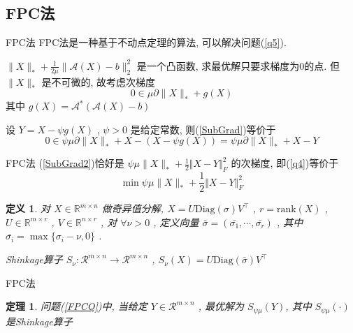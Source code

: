 \documentclass[slidestop, compress, mathserif, UTF8]{beamer}
\newtheorem{theo}{\bf \textcolor[rgb]{0.8,0,0}{定理}}[section]          %
\newtheorem{define}{\bf \textcolor[rgb]{0.8,0,0}{定义}}[section]
\numberwithin{equation}{section}                                        %
\begin{document}
		\subsection{FPC法}        
			\begin{frame}[t]{FPC法}
				FPC法是一种基于不动点定理的算法, 可以解决问题(\ref{q5}).

				$\lVert{X}\rVert_*+\frac{1}{2\mu}\lVert{\mathcal{A}(X)-b}\rVert_2^2$ 是一个凸函数, 求最优解只要求梯度为0的点. 但 $\lVert{X}\rVert_*$ 是不可微的, 故考虑次梯度
				\begin{equation}\label{SubGrad}
					0 \in \mu \partial \lVert{X}\rVert_* + g(X)
				\end{equation}
				\small{其中 $g(X) = \mathcal{A}^*(\mathcal{A}(X) - b)$}\normalsize

				设 $Y = X - \psi g(X)$ , $\psi > 0$ 是给定常数, 则(\ref{SubGrad})等价于
				\begin{equation}\label{SubGrad2}
					0 \in \psi \mu \partial \lVert{X}\rVert_* + X - (X - \psi g(X)) = \psi \mu \partial \lVert{X}\rVert_* + X -Y
				\end{equation}
			\end{frame}
			\begin{frame}[t]{FPC法}
				(\ref{SubGrad2})恰好是 $\psi \mu \lVert{X}\rVert_* + \frac{1}{2} \Vert{X - Y}\Vert^2_F$ 的次梯度, 即(\ref{q4})等价于 
				\begin{equation}\label{FPCQ}
					\min \psi \mu \lVert{X}\rVert_* + \frac{1}{2} \Vert{X - Y}\Vert^2_F
				\end{equation}

				\begin{define}
					对 $X \in \mathbb{R}^{m \times n}$ 做奇异值分解, $X = U \text{Diag}(\sigma) V ^\top$ , $r = \text{rank}(X)$ , $U \in \mathbb{R}^{m \times r}$ , $V \in \mathbb{R}^{n \times r}$ , 对 $\forall \nu > 0$ , 定义向量 $\bar{\sigma} = (\bar{\sigma_1}, \cdots, \bar{\sigma_r})$ , 其中$\bar{\sigma_i} = \max \{\sigma_i - \nu, 0\}$ .
					
					Shinkage算子 $S_\nu: \mathcal{R}^{m \times n} \rightarrow \mathcal{R}^{m \times n}$ , $S_\nu(X) = U \text{Diag}(\bar{\sigma}) V ^\top$
				\end{define}
			\end{frame}
			\begin{frame}[t]{FPC法}
				\begin{theo}
					问题(\ref{FPCQ})中, 当给定 $Y \in \mathcal{R}^{m \times n}$ , 最优解为 $S_{\psi \mu}(Y)$, 其中 $S_{\psi \mu}(\cdot)$ 是Shinkage算子
				\end{theo}
			\end{frame}
\end{document}
